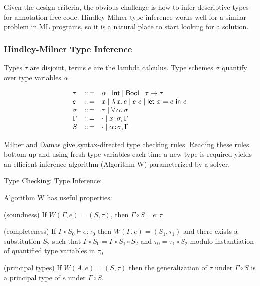\documentclass{article}
\begin{document}
Given the design criteria, the obvious challenge is how to infer descriptive
 types for annotation-free code.
Hindley-Milner type inference works well for a similar problem in ML programs,
 so it is a natural place to start looking for a solution.


\subsubsection*{Hindley-Milner Type Inference}

Types $\tau$ are disjoint, terms $e$ are the lambda calculus.
Type schemes $\sigma$ quantify over type variables $\alpha$.


\[\begin{array}{l c l}
  \tau & ::\,= & \alpha \mid \mathsf{Int} \mid \mathsf{Bool} \mid \tau \rightarrow \tau
\\ e   & ::\,= & x \mid \lambda\,x.\,e \mid e~e \mid \mathsf{let}~x = e~\mathsf{in}~e
\\\sigma & ::\,= & \tau \mid \forall\,\alpha.\,\sigma
\\\Gamma & ::\,= & \cdot \mid x\!:\!\sigma,\Gamma
\\ S & ::\,= & \cdot \mid \alpha\!:\!\sigma,\Gamma
  \end{array}\]

Milner and Damas give syntax-directed type checking rules.
Reading these rules bottom-up and using fresh type variables each time a new
 type is required yields an efficient inference algorithm (Algorithm W)
 parameterized by a solver.

Type Checking: 
\qquad\qquad
Type Inference: 

\noindent Algorithm W has useful properties:

\begin{theorem}
  (soundness) If $W(\Gamma, e) = (S, \tau)$, then $\Gamma\circ S \vdash e : \tau$
\end{theorem}

\begin{theorem}
  (completeness) If $\Gamma\circ S_0 \vdash e : \tau_0$ then $W(\Gamma, e) =
  (S_1, \tau_1)$ and there exists a substitution $S_2$ such that $\Gamma \circ
  S_0 = \Gamma \circ S_1 \circ S_2$ and $\tau_0 = \tau_1 \circ S_2$ modulo
  instantiation of quantified type variables in $\tau_0$
\end{theorem}

\begin{theorem}
  (principal types) If $W(A,e) = (S,\tau)$ then the generalization
  of $\tau$ under $\Gamma \circ S$ is a principal type of $e$ under $\Gamma \circ S$.
\end{theorem}
\end{document}
